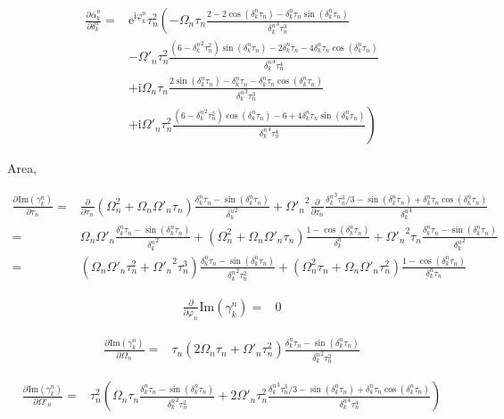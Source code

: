 \documentclass[10pt,fleqn]{article}
\newcommand{\ue}{\mathrm{e}}
\newcommand{\ui}{\mathrm{i}}
\newcommand{\eqar}[1]
{
  \begin{align*}
    #1
  \end{align*}
}
\newcommand{\paren}[1]{{\left({#1}\right)}}
\newcommand{\lparen}[1]{{\left({#1}\right.}}
\newcommand{\rparen}[1]{{\left.{#1}\right)}}
\newcommand{\pdiff}[3][{}]{{\frac{\partial^{#1} {#2}}{\partial {#3}{}^{#1}}}}
\begin{document}
\eqar{
  \pdiff{\bar\alpha_k^n}{\delta_k^n}=&\ue^{\ui\varphi_k^n}\tau_n^2
  \lparen{
    -\Omega_n\tau_n\frac{2-2\cos\paren{{\delta_k^n}\tau_n}-{\delta_k^n}\tau_n\sin\paren{{\delta_k^n}\tau_n}}{{\delta_k^n}^3\tau_n^3}
  }\\
  &-\Omega'_n\tau_n^2\frac{
    \paren{6-{\delta_k^n}^2\tau_n^2}\sin\paren{{\delta_k^n}\tau_n}
    -2{\delta_k^n}\tau_n
    -4{\delta_k^n}\tau_n\cos\paren{{\delta_k^n}\tau_n}
  }{{\delta_k^n}^4\tau_n^4}\\
  &+\ui\Omega_n\tau_n\frac{2\sin\paren{{\delta_k^n}\tau_n}-\delta_k^n\tau_n-\delta_k^n\tau_n\cos\paren{{\delta_k^n}\tau_n}}{{\delta_k^n}^3\tau_n^3}\\
  &\rparen{
    +\ui\Omega'_n\tau_n^2\frac{
      \paren{6-{\delta_k^n}^2\tau_n^2}\cos\paren{{\delta_k^n}\tau_n}
      -6
      +4{\delta_k^n}\tau_n\sin\paren{{\delta_k^n}\tau_n}
    }{{\delta_k^n}^4\tau_n^4}
  }
}
Area,
\eqar{
  \pdiff{\mathrm{Im}\paren{\gamma_k^n}}{\tau_n}=&\pdiff{}{\tau_n}\paren{\Omega_n^2+\Omega_n\Omega'_n\tau_n}\frac{\delta_k^n\tau_n-\sin\paren{{\delta_k^n}\tau_n}}{{\delta_k^n}^2}
  +{\Omega'_n}^2\pdiff{}{\tau_n}\frac{
    {\delta_k^n}^3\tau_n^3/3
    -\sin\paren{{\delta_k^n}\tau_n}
    +{\delta_k^n}\tau_n\cos\paren{{\delta_k^n}\tau_n}
  }{{\delta_k^n}^4}\\
  =&\Omega_n\Omega'_n\frac{\delta_k^n\tau_n-\sin\paren{{\delta_k^n}\tau_n}}{{\delta_k^n}^2}
  +\paren{\Omega_n^2+\Omega_n\Omega'_n\tau_n}\frac{
    1-\cos\paren{{\delta_k^n}\tau_n}
  }{{\delta_k^n}}
  +{\Omega'_n}^2\tau_n\frac{
    {\delta_k^n}\tau_n
    -\sin\paren{{\delta_k^n}\tau_n}
  }{{\delta_k^n}^2}\\
  =&\paren{\Omega_n\Omega'_n\tau_n^2+{\Omega'_n}^2\tau_n^3}\frac{\delta_k^n\tau_n-\sin\paren{{\delta_k^n}\tau_n}}{{\delta_k^n}^2\tau_n^2}
  +\paren{\Omega_n^2\tau_n+\Omega_n\Omega'_n\tau_n^2}\frac{
    1-\cos\paren{{\delta_k^n}\tau_n}
  }{{\delta_k^n}\tau_n}
}
\eqar{
  \pdiff{}{\varphi_n}\mathrm{Im}\paren{\gamma_k^n}=&0
}
\eqar{
  \pdiff{\mathrm{Im}\paren{\gamma_k^n}}{\Omega_n}=&\tau_n\paren{2\Omega_n\tau_n+\Omega'_n\tau_n^2}\frac{\delta_k^n\tau_n-\sin\paren{{\delta_k^n}\tau_n}}{{\delta_k^n}^2\tau_n^2}
}
\eqar{
  \pdiff{\mathrm{Im}\paren{\gamma_k^n}}{\Omega'_n}=&\tau_n^2\paren{\Omega_n\tau_n\frac{\delta_k^n\tau_n-\sin\paren{{\delta_k^n}\tau_n}}{{\delta_k^n}^2\tau_n^2}
  +2{\Omega'_n}\tau_n^2\frac{
    {\delta_k^n}^3\tau_n^3/3
    -\sin\paren{{\delta_k^n}\tau_n}
    +{\delta_k^n}\tau_n\cos\paren{{\delta_k^n}\tau_n}
  }{{\delta_k^n}^4\tau_n^4}}
}
\end{document}
